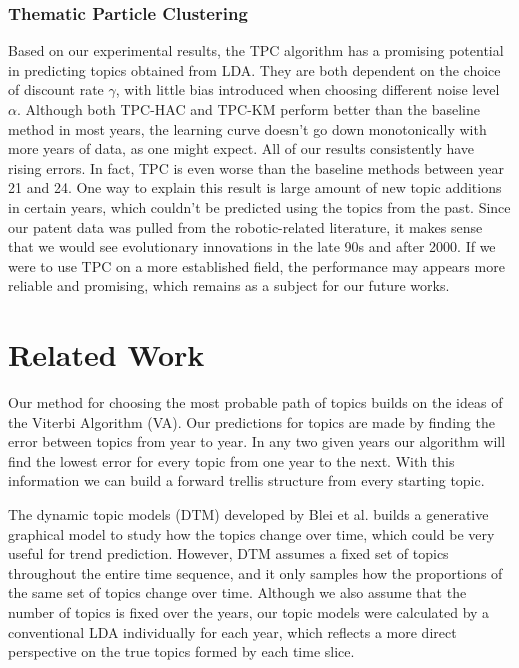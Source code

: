 \documentclass[conference]{IEEEtran}
\begin{document}
\subsubsection{Thematic Particle Clustering}
Based on our experimental results, the TPC algorithm has a promising potential in predicting topics obtained from LDA. They are both dependent on the choice of discount rate $\gamma$, with little bias introduced when choosing different noise level $\alpha$. Although both TPC-HAC and TPC-KM perform better than the baseline method in most years, the learning curve doesn't go down monotonically with more years of data, as one might expect. All of our results consistently have rising errors. In fact, TPC is even worse than the baseline methods between year 21 and 24. One way to explain this result is large amount of new topic additions in certain years, which couldn't be predicted using the topics from the past. Since our patent data was pulled from the robotic-related literature, it makes sense that we would see evolutionary innovations in the late 90s and after 2000. If we were to use TPC on a more established field, the performance may appears more reliable and promising, which remains as a subject for our future works.



\section{Related Work}
Our method for choosing the most probable path of topics builds on the ideas of the Viterbi Algorithm (VA)\cite{viterbi}. Our predictions for topics are made by finding the error between topics from year to year. In any two given years our algorithm will find the lowest error for every topic from one year to the next. With this information we can build a forward trellis structure from every starting topic.

The dynamic topic models (DTM) developed by Blei et al. \cite{blei2006} builds a generative graphical model to study how the topics change over time, which could be very useful for trend prediction. However, DTM assumes a fixed set of topics throughout the entire time sequence, and it only samples how the proportions of the same set of topics change over time. Although we also assume that the number of topics is fixed over the years, our topic models were calculated by a conventional LDA individually for each year, which reflects a more direct perspective on the true topics formed by each time slice.
\end{document}
